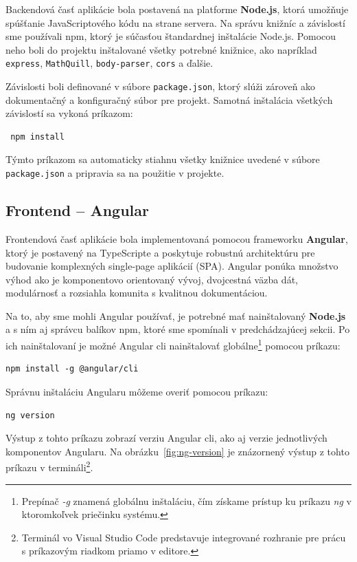  Backendová časť aplikácie bola postavená na platforme \textbf{Node.js}, ktorá umožňuje spúšťanie JavaScriptového kódu na strane servera. Na správu knižníc a závislostí sme používali \acrfull{npm}, ktorý je súčasťou štandardnej inštalácie Node.js. 
 Pomocou neho boli do projektu inštalované všetky potrebné knižnice, ako napríklad \texttt{express}, \texttt{MathQuill}, \texttt{body-parser}, \texttt{cors} a ďalšie.
  
 Závislosti boli definované v súbore \texttt{package.json}, ktorý slúži zároveň ako dokumentačný a konfiguračný súbor pre projekt. Samotná inštalácia všetkých závislostí sa vykoná príkazom:
 
 \begin{verbatim}
 npm install
 \end{verbatim}
 
 Týmto príkazom sa automaticky stiahnu všetky knižnice uvedené v súbore \texttt{package.json} a pripravia sa na použitie v projekte.
 
 \subsection{Frontend – Angular}

Frontendová časť aplikácie bola implementovaná pomocou frameworku \textbf{Angular}, ktorý je postavený na TypeScripte a poskytuje robustnú architektúru pre budovanie komplexných single-page aplikácií (SPA).
 Angular ponúka množstvo výhod ako je komponentovo orientovaný vývoj, dvojcestná väzba dát, modulárnosť a rozsiahla komunita s kvalitnou dokumentáciou.

\bigskip
Na to, aby sme mohli Angular používať, je potrebné mať nainštalovaný \textbf{Node.js} a s ním aj správcu balíkov \acrshort{npm}, ktoré sme spomínali v predchádzajúcej sekcii. 
Po ich nainštalovaní je možné Angular \acrshort{cli} nainštalovať globálne\footnote{Prepínač \textit{-g} znamená globálnu inštaláciu, čím získame prístup ku príkazu \textit{ng} v ktoromkoľvek priečinku systému.}
pomocou príkazu:

\begin{verbatim}
npm install -g @angular/cli
\end{verbatim}

Správnu inštaláciu Angularu môžeme overiť pomocou príkazu:

\begin{verbatim}
ng version
\end{verbatim}

Výstup z tohto príkazu zobrazí verziu Angular \acrshort{cli}, ako aj verzie jednotlivých komponentov Angularu. Na obrázku~\ref{fig:ng-version} je znázornený výstup z tohto príkazu v termináli\footnote{Terminál vo Visual Studio Code predstavuje integrované rozhranie pre prácu s príkazovým riadkom priamo v editore.}.

